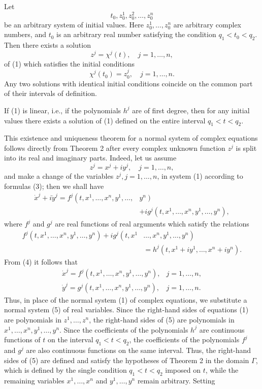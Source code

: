 \documentclass[10pt,a5paper]{book}
\theoremstyle{plain}
\theoremstyle{definition}
\theoremstyle{remark}
\begin{document}
Let
\[
t_{0}, z_{0}^{1}, z_{0}^{2}, \ldots, z_{0}^{n}
\]
be an arbitrary system of initial values. Here $z_{0}^{1}, \ldots, z_{0}^{n}$ are arbitrary complex numbers, and $t_{0}$ is an arbitrary real number satisfying the condition $q_{1}<t_{0}<q_{2}$. Then there exists a solution
\[
z^{j}=\chi^{j}(t), \quad j=1, \ldots, n,
\]
of (1) which satisfies the initial conditions
\[
\chi^{j}\left(t_{0}\right)=z_{0}^{j}, \quad j=1, \ldots, n .
\]
Any two solutions with identical initial conditions coincide on the common part of their intervals of definition.

If (1) is linear, i.e., if the polynomials $h^{j}$ are of first degree, then for any initial values there exists a solution of (1) defined on the entire interval $q_{1}<t<q_{2}$.

This existence and uniqueness theorem for a normal system of complex equations follows directly from Theorem 2 after every complex unknown function $z^{j}$ is split into its real and imaginary parts. Indeed, let us assume
\begin{equation*}
z^{j}=x^{j}+i y^{j}, \quad j=1, \ldots, n, \tag{3}
\end{equation*}
and make a change of the variables $z^{j}, j=1, \ldots, n$, in system (1) according to formulas (3); then we shall have
\begin{align*}
\dot{x}^{j}+i \ddot{y}^{j}=f^{j}\left(t, x^{1}, \ldots, x^{n}, y^{1}, \ldots,\right. & \left.y^{n}\right) \\
& +i g^{j}\left(t, x^{1}, \ldots, x^{n}, y^{1}, \ldots, y^{n}\right), \tag{4}
\end{align*}
where $f^{j}$ and $g^{j}$ are real functions of real arguments which satisfy the relations
\[
\begin{aligned}
f^{j}\left(t, x^{1}, \ldots, x^{n}, y^{1}, \ldots, y^{n}\right)+i g^{j}\left(t, x^{1}\right. & \left.\ldots, x^{n}, y^{1}, \ldots, y^{n}\right) \\
& =h^{j}\left(t, x^{1}+i y^{1}, \ldots, x^{n}+i y^{n}\right) .
\end{aligned}
\]
From (4) it follows that
\[
\begin{array}{ll}
\dot{x}^{j}=f^{j}\left(t, x^{1}, \ldots, x^{n}, y^{1}, \ldots, y^{n}\right), & j=1, \ldots, n, \\
\dot{y}^{j}=g^{j}\left(t, x^{1}, \ldots, x^{n}, y^{1}, \ldots, y^{n}\right), & j=1, \ldots, n . \tag{5}
\end{array}
\]
Thus, in place of the normal system (1) of complex equations, we substitute a normal system (5) of real variables. Since the right-hand sides of equations (1) are polynomials in $z^{1}, \ldots, z^{n}$, the right-hand sides of (5) are polynomials in $x^{1}, \ldots, x^{n}, y^{1}, \ldots, y^{n}$. Since the coefficients of the polynomials $h^{j}$ are continuous functions of $t$ on the interval $q_{1}<t<q_{2}$, the coefficients of the polynomials $f^{j}$ and $g^{j}$ are also continuous functions on the same interval. Thus, the right-hand sides of (5) are defined and satisfy the hypotheses of Theorem 2 in the domain $\Gamma$, which is defined by the single condition $q_{1}<t<q_{2}$ imposed on $t$, while the remaining variables $x^{1}, \ldots, x^{n}$ and $y^{1}, \ldots, y^{n}$ remain arbitrary. Setting
\end{document}
